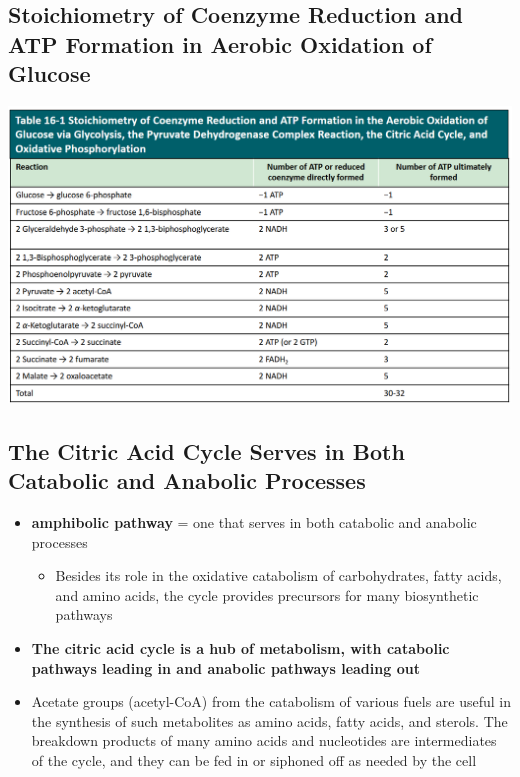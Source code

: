 \documentclass[10pt]{article}
\begin{document}
\subsection*{Stoichiometry of Coenzyme Reduction and ATP Formation in Aerobic Oxidation of Glucose}
\begin{center} 
    \includegraphics*[width=\textwidth]{L4_22.png} 
\end{center}

\subsection*{The Citric Acid Cycle Serves in Both Catabolic and Anabolic Processes}
\begin{itemize}
	\item \textbf{amphibolic pathway} = one that serves in both catabolic and anabolic processes
	\begin{itemize}
        \item Besides its role in the oxidative catabolism of carbohydrates, fatty acids, and amino acids, the cycle provides precursors for many biosynthetic pathways
    \end{itemize}
    \item \textbf{The citric acid cycle is a hub of metabolism, with catabolic pathways leading in and anabolic pathways leading out}
    \item Acetate groups (acetyl-CoA) from the catabolism of various fuels are useful in the synthesis of such metabolites as amino acids, fatty acids, and sterols.  The breakdown products of many amino acids and nucleotides are intermediates of the cycle, and they can be fed in or siphoned off as needed by the cell
\end{itemize}
\end{document}
